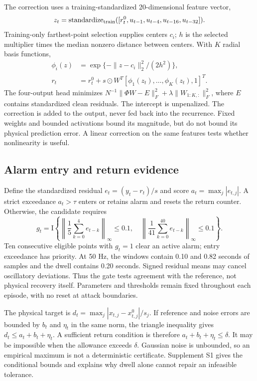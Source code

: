 \documentclass[11pt]{article}
\begin{document}
The correction uses a training-standardized 20-dimensional feature vector,
\[z_t=\operatorname{standardize}_{\rm train}([r_t^0,u_{t-1},u_{t-4},u_{t-16},u_{t-32}]).\] Training-only farthest-point selection supplies centers $c_i$; $h$ is the selected multiplier times the median nonzero distance between centers. With $K$ radial basis functions,
\begin{align}
 \phi_i(z)&=\exp\{-\|z-c_i\|_2^2/(2h^2)\},\\
 r_t&=r_t^0+s\odot W^T[\phi_1(z_t),\ldots,\phi_K(z_t),1]^T .\label{eq:rbf}
\end{align}
The four-output head minimizes $N^{-1}\|\Phi W-E\|_F^2+\lambda\|W_{1:K,:}\|_F^2$, where $E$ contains standardized clean residuals. The intercept is unpenalized. The correction is added to the output, never fed back into the recurrence. Fixed weights and bounded activations bound its magnitude, but do not bound its physical prediction error. A linear correction on the same features tests whether nonlinearity is useful.

\subsection{Alarm entry and return evidence}
Define the standardized residual $e_t=(y_t-r_t)/s$ and score $a_t=\max_j|e_{t,j}|$. A strict exceedance $a_t>\tau$ enters or retains alarm and resets the return counter. Otherwise, the candidate requires
\begin{equation}
 g_t=\mathrm{I}\!\left\{
 \left\|\frac{1}{5}\sum_{k=0}^{4}e_{t-k}\right\|_\infty\le0.1,
 \quad\left\|\frac{1}{41}\sum_{k=0}^{40}e_{t-k}\right\|_\infty\le0.1
 \right\}.\label{eq:gate}
\end{equation}
Ten consecutive eligible points with $g_t=1$ clear an active alarm; entry exceedance has priority. At 50 Hz, the windows contain 0.10 and 0.82 seconds of samples and the dwell contains 0.20 seconds. Signed residual means may cancel oscillatory deviations. Thus the gate tests agreement with the reference, not physical recovery itself. Parameters and thresholds remain fixed throughout each episode, with no reset at attack boundaries.

The physical target is $d_t=\max_j|x_{t,j}-x_{t,j}^0|/s_j$. If reference and noise errors are bounded by $b_t$ and $\eta_t$ in the same norm, the triangle inequality gives $d_t\le a_t+b_t+\eta_t$. A sufficient return condition is therefore $a_t+b_t+\eta_t\le\delta$. It may be impossible when the allowance exceeds $\delta$. Gaussian noise is unbounded, so an empirical maximum is not a deterministic certificate. Supplement S1 gives the conditional bounds and explains why dwell alone cannot repair an infeasible tolerance.
\end{document}
